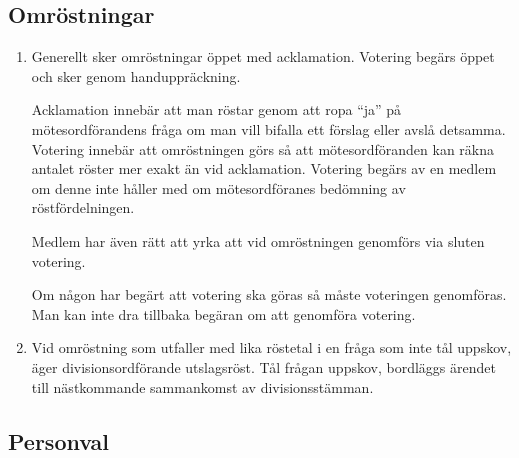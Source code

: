\documentclass{dvd}
\begin{document}
	\subsection{Omröstningar}

	\begin{enumerate}[label=\arabic* §, ref=\arabic*]
		\item Generellt sker omröstningar öppet med acklamation.
		Votering begärs öppet och sker genom handuppräckning.

		Acklamation innebär att man röstar genom att ropa ``ja'' på mötesordförandens fråga om man vill bifalla ett förslag eller avslå detsamma.
		Votering innebär att omröstningen görs så att mötesordföranden kan räkna antalet röster mer exakt än vid acklamation.
		Votering begärs av en medlem om denne inte håller med om mötesordföranes bedömning av röstfördelningen.

		Medlem har även rätt att yrka att vid omröstningen genomförs via sluten votering.

		Om någon har begärt att votering ska göras så måste voteringen genomföras.
		Man kan inte dra tillbaka begäran om att genomföra votering.

		\item Vid omröstning som utfaller med lika röstetal i en fråga som inte tål uppskov, äger divisionsordförande utslagsröst.
		Tål frågan uppskov, bordläggs ärendet till nästkommande sammankomst av divisionsstämman.
	\end{enumerate}

	\subsection{Personval}
\end{document}
